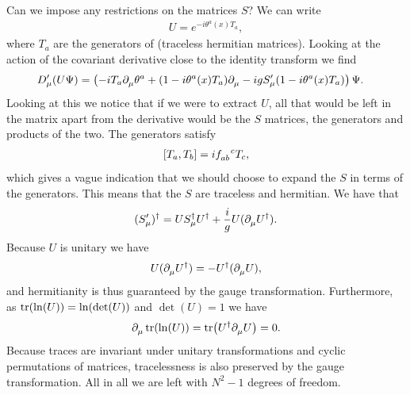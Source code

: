 Can we impose any restrictions on the matrices $S$? We can write
\begin{align*}
	U = e^{-i\theta^{a}(x)T_{a}},
\end{align*}
where $T_{a}$ are the generators of  (traceless hermitian matrices). Looking at the action of the covariant derivative close to the identity transform we find
\begin{align*}
	D_{\mu}^{\prime}(U\Psi) &= \left(-iT_{a}\partial^{}_{\mu}\theta^{a} + (1 - i\theta^{a}(x)T_{a})\partial^{}_{\mu} - igS_{\mu}^{\prime}(1 - i\theta^{a}(x)T_{a})\right)\Psi.
\end{align*}
Looking at this we notice that if we were to extract $U$, all that would be left in the matrix apart from the derivative would be the $S$ matrices, the generators and products of the two. The generators satisfy
\begin{align*}
	\comm{T_{a}}{T_{b}} = i\srconst{ab}{c}T_{c},
\end{align*}
which gives a vague indication that we should choose to expand the $S$ in terms of the generators. This means that the $S$ are traceless and hermitian. We have that
\begin{align*}
	(S_{\mu}^{\prime})^{\dagger} = US_{\mu}^{\dagger} U^{\dagger} + \frac{i}{g}U(\partial^{}_{\mu}U^{\dagger}).
\end{align*}
Because $U$ is unitary we have
\begin{align*}
	U(\partial^{}_{\mu}U^{\dagger}) = -U^{\dagger}(\partial^{}_{\mu}U),
\end{align*}
and hermitianity is thus guaranteed by the gauge transformation. Furthermore, as $\tr(\ln(U)) = \ln(\det(U))$ and $\det(U) = 1$ we have
\begin{align*}
	\partial^{}_{\mu}\tr(\ln(U)) = \tr(U^{\dagger}\partial^{}_{\mu}U) = 0.
\end{align*}
Because traces are invariant under unitary transformations and cyclic permutations of matrices, tracelessness is also preserved by the gauge transformation. All in all we are left with $N^{2} - 1$ degrees of freedom.

